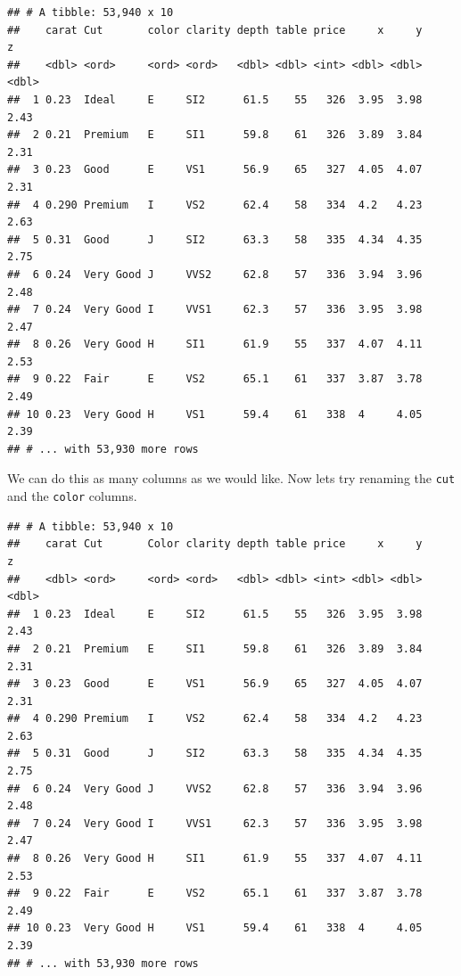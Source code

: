\documentclass[
]{book}
\newenvironment{Shaded}{\begin{snugshade}}{\end{snugshade}}
\newcommand{\DataTypeTok}[1]{\textcolor[rgb]{0.13,0.29,0.53}{#1}}
\newcommand{\KeywordTok}[1]{\textcolor[rgb]{0.13,0.29,0.53}{\textbf{#1}}}
\newcommand{\NormalTok}[1]{#1}
\newcommand{\OperatorTok}[1]{\textcolor[rgb]{0.81,0.36,0.00}{\textbf{#1}}}
\newcommand{\StringTok}[1]{\textcolor[rgb]{0.31,0.60,0.02}{#1}}
\begin{document}
\begin{Shaded}
\end{Shaded}

\begin{verbatim}
## # A tibble: 53,940 x 10
##    carat Cut       color clarity depth table price     x     y     z
##    <dbl> <ord>     <ord> <ord>   <dbl> <dbl> <int> <dbl> <dbl> <dbl>
##  1 0.23  Ideal     E     SI2      61.5    55   326  3.95  3.98  2.43
##  2 0.21  Premium   E     SI1      59.8    61   326  3.89  3.84  2.31
##  3 0.23  Good      E     VS1      56.9    65   327  4.05  4.07  2.31
##  4 0.290 Premium   I     VS2      62.4    58   334  4.2   4.23  2.63
##  5 0.31  Good      J     SI2      63.3    58   335  4.34  4.35  2.75
##  6 0.24  Very Good J     VVS2     62.8    57   336  3.94  3.96  2.48
##  7 0.24  Very Good I     VVS1     62.3    57   336  3.95  3.98  2.47
##  8 0.26  Very Good H     SI1      61.9    55   337  4.07  4.11  2.53
##  9 0.22  Fair      E     VS2      65.1    61   337  3.87  3.78  2.49
## 10 0.23  Very Good H     VS1      59.4    61   338  4     4.05  2.39
## # ... with 53,930 more rows
\end{verbatim}

We can do this as many columns as we would like. Now lets try renaming the \texttt{cut} and the \texttt{color} columns.

\begin{Shaded}
\end{Shaded}

\begin{verbatim}
## # A tibble: 53,940 x 10
##    carat Cut       Color clarity depth table price     x     y     z
##    <dbl> <ord>     <ord> <ord>   <dbl> <dbl> <int> <dbl> <dbl> <dbl>
##  1 0.23  Ideal     E     SI2      61.5    55   326  3.95  3.98  2.43
##  2 0.21  Premium   E     SI1      59.8    61   326  3.89  3.84  2.31
##  3 0.23  Good      E     VS1      56.9    65   327  4.05  4.07  2.31
##  4 0.290 Premium   I     VS2      62.4    58   334  4.2   4.23  2.63
##  5 0.31  Good      J     SI2      63.3    58   335  4.34  4.35  2.75
##  6 0.24  Very Good J     VVS2     62.8    57   336  3.94  3.96  2.48
##  7 0.24  Very Good I     VVS1     62.3    57   336  3.95  3.98  2.47
##  8 0.26  Very Good H     SI1      61.9    55   337  4.07  4.11  2.53
##  9 0.22  Fair      E     VS2      65.1    61   337  3.87  3.78  2.49
## 10 0.23  Very Good H     VS1      59.4    61   338  4     4.05  2.39
## # ... with 53,930 more rows
\end{verbatim}
\end{document}
